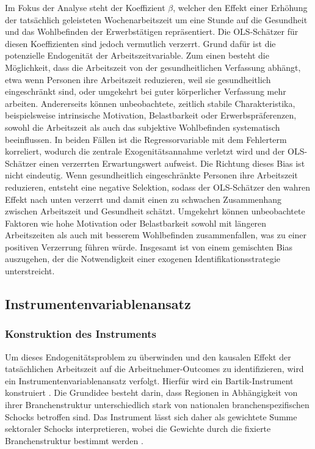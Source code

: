 \documentclass[12pt,a4paper]{article}
\begin{document}
Im Fokus der Analyse steht der Koeffizient $\beta$, welcher den Effekt einer Erhöhung der tatsächlich geleisteten Wochenarbeitszeit um eine Stunde auf die Gesundheit und das Wohlbefinden der Erwerbstätigen repräsentiert. Die OLS-Schätzer für diesen Koeffizienten sind jedoch vermutlich verzerrt. Grund dafür ist die potenzielle Endogenität der Arbeitszeitvariable. Zum einen besteht die Möglichkeit, dass die Arbeitszeit von der gesundheitlichen Verfassung abhängt, etwa wenn Personen ihre Arbeitszeit reduzieren, weil sie gesundheitlich eingeschränkt sind, oder umgekehrt bei guter körperlicher Verfassung mehr arbeiten. Andererseits können unbeobachtete, zeitlich stabile Charakteristika, beispielsweise intrinsische Motivation, Belastbarkeit oder Erwerbspräferenzen, sowohl die Arbeitszeit als auch das subjektive Wohlbefinden systematisch beeinflussen. In beiden Fällen ist die Regressorvariable mit dem Fehlerterm korreliert, wodurch die zentrale Exogenitätsannahme verletzt wird und der OLS-Schätzer einen verzerrten Erwartungswert aufweist. Die Richtung dieses Bias ist nicht eindeutig. Wenn gesundheitlich eingeschränkte Personen ihre Arbeitszeit reduzieren, entsteht eine negative Selektion, sodass der OLS-Schätzer den wahren Effekt nach unten verzerrt und damit einen zu schwachen Zusammenhang zwischen Arbeitszeit und Gesundheit schätzt. Umgekehrt können unbeobachtete Faktoren wie hohe Motivation oder Belastbarkeit sowohl mit längeren Arbeitszeiten als auch mit besserem Wohlbefinden zusammenfallen, was zu einer positiven Verzerrung führen würde. Insgesamt ist von einem gemischten Bias auszugehen, der die Notwendigkeit einer exogenen Identifikationsstrategie unterstreicht. 

\subsection{Instrumentenvariablenansatz}
\subsubsection{Konstruktion des Instruments}
Um dieses Endogenitätsproblem zu überwinden und den kausalen Effekt der tatsächlichen Arbeitszeit auf die Arbeitnehmer-Outcomes zu identifizieren, wird ein Instrumentenvariablenansatz verfolgt. Hierfür wird ein Bartik-Instrument konstruiert \parencite{bartik1991}. Die Grundidee besteht darin, dass Regionen in Abhängigkeit von ihrer Branchenstruktur unterschiedlich stark von nationalen branchenspezifischen Schocks betroffen sind. Das Instrument lässt sich daher als gewichtete Summe sektoraler Schocks interpretieren, wobei die Gewichte durch die fixierte Branchenstruktur bestimmt werden \parencite{goldsmith2020}.
\end{document}
